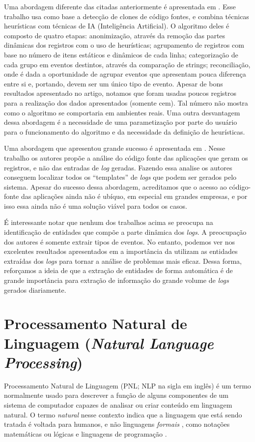 \documentclass[
	12pt,				%
	openright,			%
	twoside,			%
	a4paper,			%
	english,			%
	spanish,			%
	brazil,				%
	]{abntex2}
\begin{document}
Uma abordagem diferente das citadas anteriormente é apresentada em \cite{jiang2008automated}. Esse trabalho usa como base a detecção de clones de código fontes, e combina técnicas heurísticas com técnicas de IA (Inteligência Artificial).  O algoritmo deles é composto de quatro etapas: anonimização, através da remoção das partes dinâmicas dos registros com o uso de heurísticas; agrupamento de registros com base no número de itens estáticos e dinâmicos de cada linha; categorização de cada grupo em eventos destintos, através da comparação de strings; reconciliação, onde é dada a oportunidade de agrupar eventos que apresentam pouca diferença entre si e, portando, devem ser um único tipo de evento. Apesar de bons resultados apresentado no artigo, notamos que foram usadas poucos registros para a realização dos dados apresentados (somente cem). Tal número não mostra como o algoritmo se comportaria em ambientes reais. Uma outra desvantagem dessa abordagem é a necessidade de uma parametização por parte do usuário para o funcionamento do algoritmo e da necessidade da definição de heurísticas.

Uma abordagem que apresentou grande sucesso é apresentada em \cite{xu2009detecting}. Nesse trabalho os autores propõe a análise do código fonte das aplicações que geram os registros, e não das entradas de \emph{log} geradas. Fazendo essa analise os autores conseguem localizar todos os ``templates'' de \emph{logs} que podem ser gerados pelo sistema. Apesar do sucesso dessa abordagem, acreditamos que o acesso ao código-fonte das aplicações ainda não é ubíquo, em especial em grandes empresas, e por isso essa ainda não é uma solução viável para todos os casos. 

É interessante notar que nenhum dos trabalhos acima se preocupa na identificação de entidades que compõe a parte dinâmica dos \emph{logs}. A preocupação dos autores é somente extrair tipos de eventos. No entanto, podemos ver nos excelentes resultados apresentados em \cite{xu2008mining,yen2013beehive} a importância da utilizam as entidades extraídas dos \emph{logs} para tornar a análise de problemas mais eficaz. Dessa forma, reforçamos a ideia de que a extração de entidades de forma automática é de grande importância para extração de informação do grande volume de \emph{logs} gerados diariamente.

\section{Processamento Natural de Linguagem (\emph{Natural Language Processing})}
Processamento Natural de Linguagem (PNL; NLP na sigla em inglês) é um termo normalmente usado para descrever a função de alguns componentes de um sistema de computador capazes de analisar ou criar conteúdo em linguagem natural. O termo \emph{natural} nesse contexto indica que a linguagem que está sendo tratada é voltada para humanos, e não linguagens \emph{formais} , como notações matemáticas ou lógicas e linguagens de programação \cite{jackson2002natural}.
\end{document}
